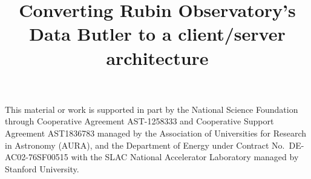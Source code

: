\documentclass[]{spie}
\begin{document}

\title{Converting Rubin Observatory's Data Butler to a client/server architecture}

\maketitle






\acknowledgments

This material or work is supported in part by the National Science Foundation through Cooperative Agreement AST-1258333 and Cooperative Support Agreement AST1836783 managed by the Association of Universities for Research in Astronomy (AURA), and the Department of Energy under Contract No.\ DE-AC02-76SF00515 with the SLAC National Accelerator Laboratory managed by Stanford University.



\end{document}
